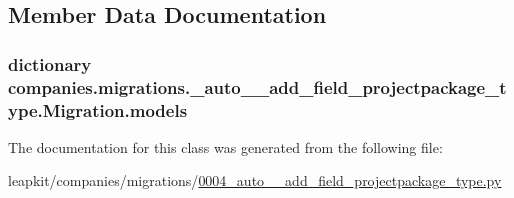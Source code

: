 \subsection{Member Data Documentation}
\hypertarget{classcompanies_1_1migrations_1_10004__auto____add__field__projectpackage__type_1_1_migration_ab185fb082a0393fdc6d12a3a3e465df2}{
\subsubsection[{models}]{\setlength{\rightskip}{0pt plus 5cm}dictionary companies.\-migrations.\-\_\-auto\-\_\-\-\_\-add\-\_\-field\-\_\-projectpackage\-\_\-type.\-Migration.\-models\hspace{0.3cm}{\ttfamily [static]}}}\label{classcompanies_1_1migrations_1_10004__auto____add__field__projectpackage__type_1_1_migration_ab185fb082a0393fdc6d12a3a3e465df2}


The documentation for this class was generated from the following file\-:\begin{DoxyCompactItemize}
\item 
leapkit/companies/migrations/\hyperlink{0004__auto____add__field__projectpackage__type_8py}{0004\-\_\-auto\-\_\-\-\_\-add\-\_\-field\-\_\-projectpackage\-\_\-type.\-py}\end{DoxyCompactItemize}

